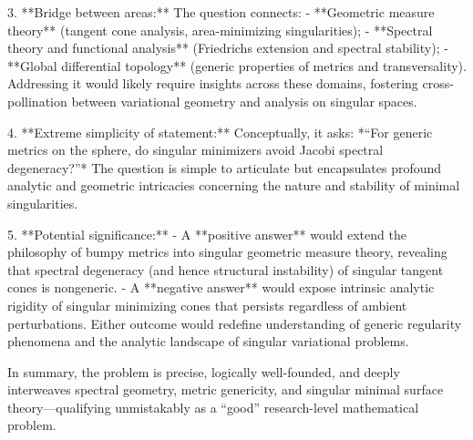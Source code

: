 3. **Bridge between areas:**  
   The question connects:
   - **Geometric measure theory** (tangent cone analysis, area-minimizing singularities);
   - **Spectral theory and functional analysis** (Friedrichs extension and spectral stability);
   - **Global differential topology** (generic properties of metrics and transversality).  
   Addressing it would likely require insights across these domains, fostering cross-pollination between variational geometry and analysis on singular spaces.

4. **Extreme simplicity of statement:**  
   Conceptually, it asks:  
   *“For generic metrics on the sphere, do singular minimizers avoid Jacobi spectral degeneracy?”*  
   The question is simple to articulate but encapsulates profound analytic and geometric intricacies concerning the nature and stability of minimal singularities.

5. **Potential significance:**  
   - A **positive answer** would extend the philosophy of bumpy metrics into singular geometric measure theory, revealing that spectral degeneracy (and hence structural instability) of singular tangent cones is nongeneric.  
   - A **negative answer** would expose intrinsic analytic rigidity of singular minimizing cones that persists regardless of ambient perturbations.  
   Either outcome would redefine understanding of generic regularity phenomena and the analytic landscape of singular variational problems.

In summary, the problem is precise, logically well-founded, and deeply interweaves spectral geometry, metric genericity, and singular minimal surface theory—qualifying unmistakably as a “good” research-level mathematical problem.